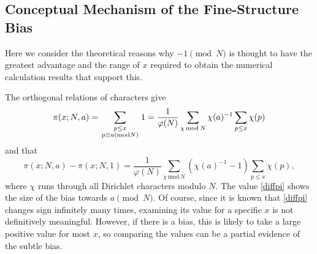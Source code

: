 \documentclass[12pt,reqno]{amsart}
\theoremstyle{definition}
\theoremstyle{remark}
\numberwithin{equation}{section}
\begin{document}
\begin{table}[h!tbp]
\centering
\caption{The ranking of small values of $\log L(1, \chi_{1,a})$ among quadratic non-residues for composite  $N$.}
\label{tab:composite_moduli}
\small
{}
\end{table}


\subsection{Conceptual Mechanism of the Fine-Structure Bias}
Here we consider the theoretical reasons 
why $-1\pmod N$ is thought to have the greatest advantage 
and the range of $x$ required to obtain the numerical calculation results that support this.

The orthogonal relations of characters give
\[
\pi(x;N,a)
=\sum_{\genfrac{}{}{0pt}{1}{p\le x}{p\equiv a(\mathrm{mod} N)}}1
=\frac1{\varphi(N)}\sum_{\chi\, \mathrm{mod}\, N}\chi(a)^{-1}\sum_{p\le x}\chi(p)
\]
and that
\begin{equation}\label{diffpi}
\pi(x;N,a)-\pi(x;N,1)
=\frac1{\varphi(N)}\sum_{\chi\, \mathrm{mod}\, N}\left(\chi(a)^{-1}-1\right)\sum_{p\le x}\chi(p),
\end{equation}
where $\chi$ runs through all Dirichlet characters modulo $N$.
The value \eqref{diffpi} shows the size of the bias towards $a\pmod N$.
Of course, since it is known that \eqref{diffpi} changes sign infinitely many times, 
examining its value for a specific $x$ is not definitively meaningful. 
However, if there is a bias, this is likely to take a large positive value for most $x$, 
so comparing the values can be a partial evidence of the subtle bias.
\end{document}
